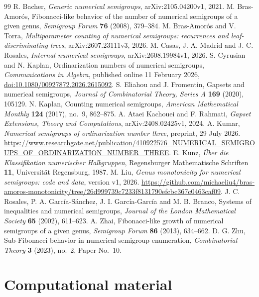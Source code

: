 \documentclass[11pt]{amsart}
\theoremstyle{definition}
\theoremstyle{remark}
\numberwithin{equation}{section}
\begin{document}
\begin{thebibliography}{99}
 R. Bacher, \emph{Generic numerical semigroups},
arXiv:2105.04200v1, 2021.
 M. Bras-Amor\'os, Fibonacci-like behavior of the number
of numerical semigroups of a given genus, \emph{Semigroup Forum}
\textbf{76} (2008), 379--384.
 M. Bras-Amor\'os and V. Torra,
\emph{Multiparameter counting of numerical semigroups: recurrences and
leaf-discriminating trees}, arXiv:2607.23111v3, 2026.
 M. Casas, J. A. Madrid and J. C. Rosales,
\emph{Internal numerical semigroups}, arXiv:2608.19984v1, 2026.
 S. Cyrusian and N. Kaplan, Ordinarization numbers of
numerical semigroups, \emph{Communications in Algebra}, published
online 11 February 2026, \href{https://doi.org/10.1080/00927872.2026.2615092}
{doi:10.1080/00927872.2026.2615092}.
 S. Eliahou and J. Fromentin, Gapsets and numerical
semigroups, \emph{Journal of Combinatorial Theory, Series A}
\textbf{169} (2020), 105129.
 N. Kaplan, Counting numerical semigroups,
\emph{American Mathematical Monthly} \textbf{124} (2017), no.~9, 862--875.
 A. Ataei Kachouei and F. Rahmati,
\emph{Gapset Extensions, Theory and Computations},
arXiv:2408.02425v1, 2024.
 A. Kumar, \emph{Numerical semigroups of ordinarization
number three}, preprint, 29 July 2026.
\url{https://www.researchgate.net/publication/410922576_NUMERICAL_SEMIGROUPS_OF_ORDINARIZATION_NUMBER_THREE}.
 E. Kunz, \emph{\"Uber die Klassifikation numerischer
Halbgruppen}, Regensburger Mathematische Schriften \textbf{11},
Universit\"at Regensburg, 1987.
 M. Liu, \emph{Genus monotonicity for numerical
semigroups: code and data}, version v1, 2026.
\url{https://github.com/michaeliu4/bras-amoros-monotonicity/tree/26d999739c7233f8131790efcbc367c0463caf09}.
 J. C. Rosales, P. A. Garc\'ia-S\'anchez,
J. I. Garc\'ia-Garc\'ia and M. B. Branco, Systems of inequalities
and numerical semigroups, \emph{Journal of the London Mathematical
Society} \textbf{65} (2002), 611--623.
 A. Zhai, Fibonacci-like growth of numerical semigroups
of a given genus, \emph{Semigroup Forum} \textbf{86} (2013), 634--662.
 D. G. Zhu, Sub-Fibonacci behavior in numerical semigroup
enumeration, \emph{Combinatorial Theory} \textbf{3} (2023), no.~2,
Paper No.~10.
\end{thebibliography}

\clearpage
\appendix
\section{Computational material}\label{app:computation}
\end{document}
